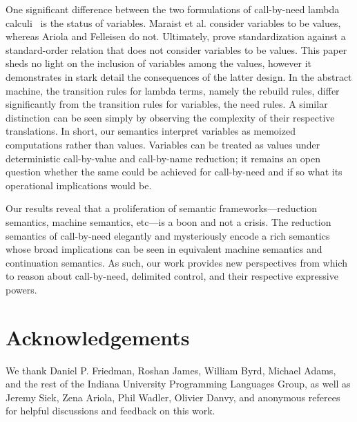\documentclass{LMCS}
\newenvironment{boxedarray}[1]
  {\begin{lrbox}{\saveboxedarray}\end{lrbox}\fbox{\usebox{\saveboxedarray}}}
\theoremstyle{plain}
\theoremstyle{remark}
\begin{document}
\begin{boxedarray}{lcl}
One significant difference between the two formulations of call-by-need lambda
calculi~\cite{maraist98need,ariola97need} is the status of variables.  Maraist
et al. consider variables to be values, whereas Ariola and Felleisen do not.
Ultimately, \citet{maraist98need} prove standardization against a
standard-order relation that does not consider variables to be values.  This
paper sheds no light on the inclusion of variables among the values, however it
demonstrates in stark detail the consequences of the latter design.  In the
abstract machine, the transition rules for lambda terms, namely the rebuild
rules, differ significantly from the transition rules for variables, the need
rules.  A similar distinction can be seen simply by observing the complexity of
their respective translations.  In short, our semantics interpret variables as
memoized computations rather than values.  Variables can be treated as 
values under deterministic call-by-value and call-by-name reduction; it remains
an open question whether the same could be achieved for call-by-need and if so
what its operational implications would be.


Our results reveal that a proliferation of semantic frameworks---reduction
semantics, machine semantics, etc---is a boon and not a crisis.  The reduction
semantics of call-by-need elegantly and mysteriously encode a rich semantics
whose broad implications can be seen in equivalent machine semantics and
continuation semantics.  As such, our work provides new perspectives from which
to reason about call-by-need, delimited control, and their respective
expressive powers.















\section{Acknowledgements}
We thank Daniel P. Friedman, Roshan James, William Byrd, Michael Adams, and the
rest of the Indiana University Programming Languages Group, as well as Jeremy
Siek, Zena Ariola, Phil Wadler, Olivier Danvy, and anonymous referees for
helpful discussions and feedback on this work.



\end{document}
